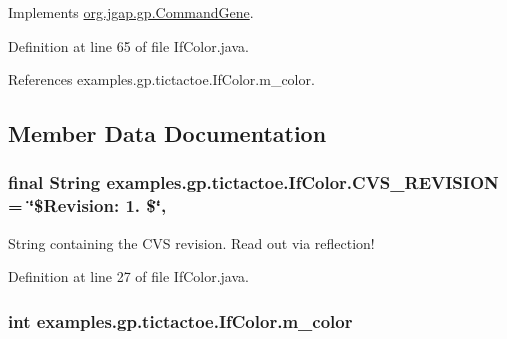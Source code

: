 Implements \hyperlink{classorg_1_1jgap_1_1gp_1_1_command_gene_a236141d99059da808afe7a9217e411c7}{org.\-jgap.\-gp.\-Command\-Gene}.



Definition at line 65 of file If\-Color.\-java.



References examples.\-gp.\-tictactoe.\-If\-Color.\-m\-\_\-color.



\subsection{Member Data Documentation}
\hypertarget{classexamples_1_1gp_1_1tictactoe_1_1_if_color_ae53f3106ae8372264cf58e51555daaec}{
\subsubsection[{C\-V\-S\-\_\-\-R\-E\-V\-I\-S\-I\-O\-N}]{\setlength{\rightskip}{0pt plus 5cm}final String examples.\-gp.\-tictactoe.\-If\-Color.\-C\-V\-S\-\_\-\-R\-E\-V\-I\-S\-I\-O\-N = \char`\"{}\$Revision\-: 1. \$\char`\"{}\hspace{0.3cm}{\ttfamily [static]}, {\ttfamily [private]}}}\label{classexamples_1_1gp_1_1tictactoe_1_1_if_color_ae53f3106ae8372264cf58e51555daaec}
String containing the C\-V\-S revision. Read out via reflection! 

Definition at line 27 of file If\-Color.\-java.

\hypertarget{classexamples_1_1gp_1_1tictactoe_1_1_if_color_a11968a779c0e382106d9b7f18574e641}{
\subsubsection[{m\-\_\-color}]{\setlength{\rightskip}{0pt plus 5cm}int examples.\-gp.\-tictactoe.\-If\-Color.\-m\-\_\-color\hspace{0.3cm}{\ttfamily [private]}}}\label{classexamples_1_1gp_1_1tictactoe_1_1_if_color_a11968a779c0e382106d9b7f18574e641}


